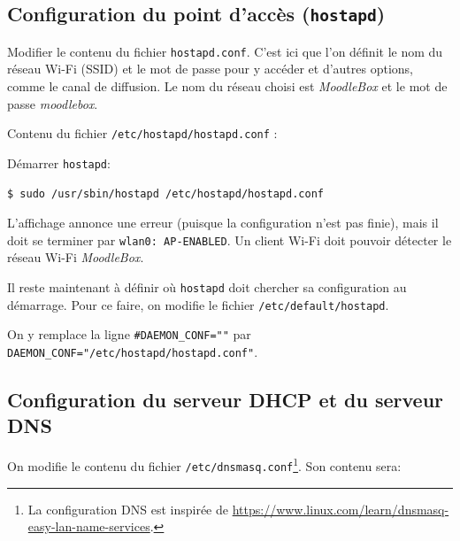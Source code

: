 \documentclass[11pt]{article}
\begin{document}
\subsection[Configuration du point d'accès (\lstinline{hostapd})]{Configuration du point d'accès (\lstinline{hostapd})}

Modifier le contenu du fichier \lstinline{hostapd.conf}. C'est ici que l'on définit le nom du réseau Wi-Fi (SSID) et le mot de passe pour y accéder et d'autres options, comme le canal de diffusion. Le nom du réseau choisi est \emph{MoodleBox} et le mot de passe \emph{moodlebox}.

Contenu du fichier \lstinline{/etc/hostapd/hostapd.conf} :



\begin{verification}
Démarrer \lstinline{hostapd}:
\begin{lstlisting}[language=bash]
$ sudo /usr/sbin/hostapd /etc/hostapd/hostapd.conf
\end{lstlisting}

L'affichage annonce une erreur (puisque la configuration n'est pas finie), mais il doit se terminer par \lstinline{wlan0: AP-ENABLED}. Un client Wi-Fi doit pouvoir détecter le réseau Wi-Fi \emph{MoodleBox}.
\end{verification}

Il reste maintenant à définir où \lstinline{hostapd} doit chercher sa configuration au démarrage. Pour ce faire, on modifie le fichier \lstinline{/etc/default/hostapd}.

On y remplace la ligne \lstinline{#DAEMON_CONF=""} par \lstinline{DAEMON_CONF="/etc/hostapd/hostapd.conf"}.

\subsection{Configuration du serveur DHCP et du serveur DNS}

On modifie le contenu du fichier \lstinline{/etc/dnsmasq.conf}\footnote{La configuration DNS est inspirée de \url{https://www.linux.com/learn/dnsmasq-easy-lan-name-services}.}. Son contenu sera:
\end{document}

